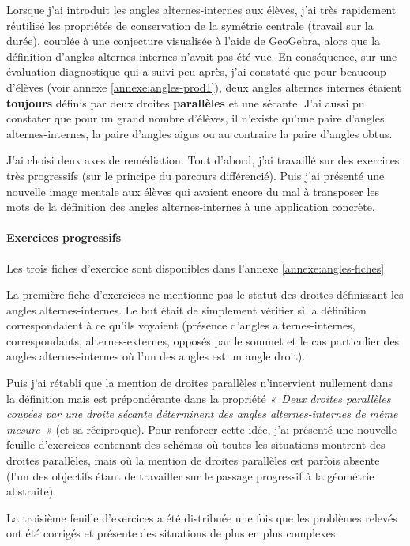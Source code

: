 Lorsque j'ai introduit les angles alternes-internes aux élèves, j'ai très rapidement réutilisé les propriétés de conservation de la symétrie centrale (travail sur la durée), couplée à une conjecture visualisée à l'aide de GeoGebra, alors que la définition d'angles alternes-internes n'avait pas été vue. En conséquence, sur une évaluation diagnostique qui a suivi peu après, j'ai constaté que pour beaucoup d'élèves (voir annexe \ref{annexe:angles-prod1}), deux angles alternes internes étaient \textbf{toujours} définis par deux droites \textbf{parallèles} et une sécante. J'ai aussi pu constater que pour un grand nombre d'élèves, il n'existe qu'une paire d'angles alternes-internes, la paire d'angles aigus ou au contraire la paire d'angles obtus.

J'ai choisi deux axes de remédiation. Tout d'abord, j'ai travaillé sur des exercices très progressifs (sur le principe du parcours différencié). Puis j'ai présenté une nouvelle image mentale aux élèves qui avaient encore du mal à transposer les mots de la définition des angles alternes-internes à une application concrète.

\paragraph{Exercices progressifs}

Les trois fiches d'exercice sont disponibles dans l'annexe \ref{annexe:angles-fiches}

La première fiche d'exercices ne mentionne pas le statut des droites définissant les angles alternes-internes. Le but était de simplement vérifier si la définition correspondaient à ce qu'ils voyaient (présence d'angles alternes-internes, correspondants, alternes-externes, opposés par le sommet et le cas particulier des angles alternes-internes où l'un des angles est un angle droit).

Puis j'ai rétabli que la mention de droites parallèles n'intervient nullement dans la définition mais est prépondérante dans la propriété \textit{« Deux droites parallèles coupées par une droite sécante déterminent des angles alternes-internes de même mesure »} (et sa réciproque). Pour renforcer cette idée, j'ai présenté une nouvelle feuille d'exercices contenant des schémas où toutes les situations montrent des droites parallèles, mais où la mention de droites parallèles est parfois absente (l'un des objectifs étant de travailler sur le passage progressif à la géométrie abstraite).

La troisième feuille d'exercices a été distribuée une fois que les problèmes relevés ont été corrigés et présente des situations de plus en plus complexes.

